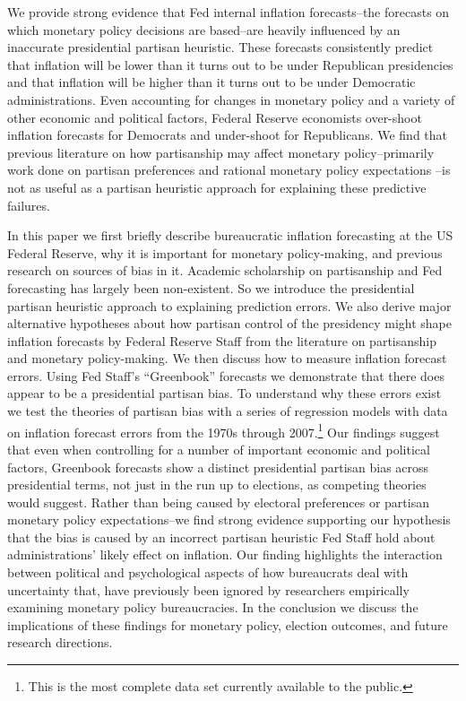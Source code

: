 \documentclass[a4paper]{article}
\begin{document}
We provide strong evidence that Fed internal inflation forecasts--the forecasts on which monetary policy decisions are based--are heavily influenced by an inaccurate presidential partisan heuristic. These forecasts consistently predict that inflation will be lower than it turns out to be under Republican presidencies and that inflation will be higher than it turns out to be under Democratic administrations. Even accounting for changes in monetary policy and a variety of other economic and political factors, Federal Reserve economists over-shoot inflation forecasts for Democrats and under-shoot for Republicans. We find that previous literature on how partisanship may affect monetary policy--primarily work done on partisan preferences \citep{Clark2012,Hakes1988,Sieg1997,Tootell1996} and rational monetary policy expectations \citep{Alesina1987,Alesina1991,Hibbs1994}--is not as useful as a partisan heuristic approach for explaining these predictive failures.

In this paper we first briefly describe bureaucratic inflation forecasting at the US Federal Reserve, why it is important for monetary policy-making, and previous research on sources of bias in it. Academic scholarship on partisanship and Fed forecasting has largely been non-existent. So we introduce the presidential partisan heuristic approach to explaining prediction errors. We also derive major alternative hypotheses about how partisan control of the presidency might shape inflation forecasts by Federal Reserve Staff from the literature on partisanship and monetary policy-making. We then discuss how to measure inflation forecast errors. Using Fed Staff's ``Greenbook'' forecasts we demonstrate that there does appear to be a presidential partisan bias. To understand why these errors exist we test the theories of partisan bias with a series of regression models with data on inflation forecast errors from the 1970s through 2007.\footnote{This is the most complete data set currently available to the public.} Our findings suggest that even when controlling for a number of important economic and political factors, Greenbook forecasts show a distinct presidential partisan bias across presidential terms, not just in the run up to elections, as competing theories would suggest. Rather than being caused by electoral preferences or partisan monetary policy expectations--we find strong evidence supporting our hypothesis that the bias is caused by an incorrect partisan heuristic Fed Staff hold about administrations' likely effect on inflation. Our finding highlights the interaction between political and psychological aspects of how bureaucrats deal with uncertainty that, have previously been ignored by researchers empirically examining monetary policy bureaucracies. In the conclusion we discuss the implications of these findings for monetary policy, election outcomes, and future research directions. 
\end{document}
